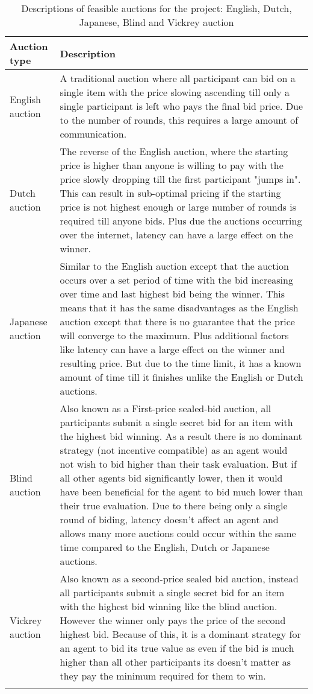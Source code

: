\begin{longtable}{|p{3cm}|p{12cm}|} \hline
    \textbf{Auction type} & \textbf{Description} \\ \hline
    English auction & A traditional auction where all participant can bid on a single item with the price slowing
        ascending till only a single participant is left who pays the final bid price. Due to the number of rounds,
        this requires a large amount of communication. \\ \hline

    Dutch auction & The reverse of the English auction, where the starting price is higher than anyone is willing to pay
        with the price slowly dropping till the first participant "jumps in". This can result in sub-optimal pricing
        if the starting price is not highest enough or large number of rounds is required till anyone bids. Plus due the auctions
        occurring over the internet, latency can have a large effect on the winner. \\ \hline

    Japanese auction & Similar to the English auction except that the auction occurs over a set period of time with the
        bid increasing over time and last highest bid being the winner. This means that it has the same disadvantages
        as the English auction except
        that there is no guarantee that the price will converge to the maximum. Plus additional factors like latency
        can have a large effect on the winner and resulting price. But due to the time limit, it has a known amount
        of time till it finishes unlike the English or Dutch auctions. \\ \hline

    Blind auction & Also known as a First-price sealed-bid auction, all participants submit a single secret bid for an
        item with the highest bid winning. As a result there is no dominant strategy (not
        incentive compatible) as an agent would not wish to bid higher than their task evaluation. But if all other
        agents bid significantly lower, then it would have been beneficial for the agent to bid much lower than their
        true evaluation. Due to there being only a single round of biding, latency doesn't affect an agent and allows many
        more auctions could occur within the same time compared to the English, Dutch or Japanese auctions. \\ \hline

    Vickrey auction~\citep{vickrey} & Also known as a second-price sealed bid auction, instead all participants submit
        a single secret bid for an item with the highest bid winning like the blind auction. However the winner only
        pays the price of the second highest bid. Because of this, it is a dominant strategy for an agent to bid its
        true value as even if the bid is much higher than all other participants its doesn't matter as they pay the
        minimum required for them to win. \\ \hline
    \caption{Descriptions of feasible auctions for the project: English, Dutch, Japanese, Blind and Vickrey auction}
    \label{tab:auctions_descriptions}
\end{longtable}

